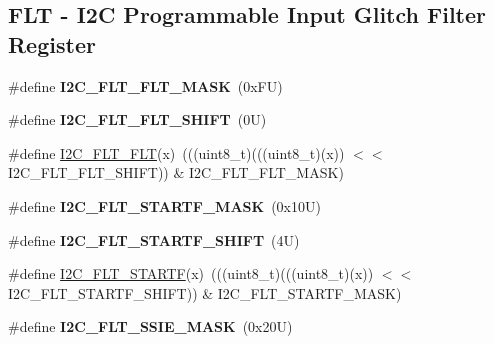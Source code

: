 \subsection*{F\+LT -\/ I2C Programmable Input Glitch Filter Register}
\begin{DoxyCompactItemize}
\item 
\mbox{\label{group___i2_c___register___masks_ga61b9691f2f522b624d0ace6268c972df}} 
\#define {\bfseries I2\+C\+\_\+\+F\+L\+T\+\_\+\+F\+L\+T\+\_\+\+M\+A\+SK}~(0x\+F\+U)
\item 
\mbox{\label{group___i2_c___register___masks_ga87c3021777b04e02f3c0481cdbde30e5}} 
\#define {\bfseries I2\+C\+\_\+\+F\+L\+T\+\_\+\+F\+L\+T\+\_\+\+S\+H\+I\+FT}~(0\+U)
\item 
\#define \mbox{\hyperlink{group___i2_c___register___masks_ga7a184e93601a1086484b0ac2752cab00}{I2\+C\+\_\+\+F\+L\+T\+\_\+\+F\+LT}}(x)~(((uint8\+\_\+t)(((uint8\+\_\+t)(x)) $<$$<$ I2\+C\+\_\+\+F\+L\+T\+\_\+\+F\+L\+T\+\_\+\+S\+H\+I\+FT)) \& I2\+C\+\_\+\+F\+L\+T\+\_\+\+F\+L\+T\+\_\+\+M\+A\+SK)
\item 
\mbox{\label{group___i2_c___register___masks_ga5957e41d1f413c45abde107e68d1f054}} 
\#define {\bfseries I2\+C\+\_\+\+F\+L\+T\+\_\+\+S\+T\+A\+R\+T\+F\+\_\+\+M\+A\+SK}~(0x10\+U)
\item 
\mbox{\label{group___i2_c___register___masks_ga60596c41d1748a538e7e752c9b701bb3}} 
\#define {\bfseries I2\+C\+\_\+\+F\+L\+T\+\_\+\+S\+T\+A\+R\+T\+F\+\_\+\+S\+H\+I\+FT}~(4\+U)
\item 
\#define \mbox{\hyperlink{group___i2_c___register___masks_gaa827d7e187b279eb296a11df6a520da9}{I2\+C\+\_\+\+F\+L\+T\+\_\+\+S\+T\+A\+R\+TF}}(x)~(((uint8\+\_\+t)(((uint8\+\_\+t)(x)) $<$$<$ I2\+C\+\_\+\+F\+L\+T\+\_\+\+S\+T\+A\+R\+T\+F\+\_\+\+S\+H\+I\+FT)) \& I2\+C\+\_\+\+F\+L\+T\+\_\+\+S\+T\+A\+R\+T\+F\+\_\+\+M\+A\+SK)
\item 
\mbox{\label{group___i2_c___register___masks_ga532d6e283f53b115820f6a20f4f442a8}} 
\#define {\bfseries I2\+C\+\_\+\+F\+L\+T\+\_\+\+S\+S\+I\+E\+\_\+\+M\+A\+SK}~(0x20\+U)
\item 
\mbox{\label{group___i2_c___register___masks_ga6fa677ac36d808e9e048d3ab81623f8c}} 

\end{DoxyCompactItemize}
